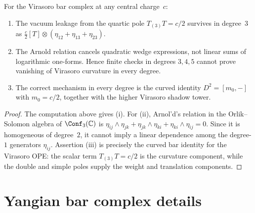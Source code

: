 \begin{proposition}
\label{prop:arnold-virasoro-deg3}
For the Virasoro bar complex at any central charge~$c$:
\begin{enumerate}[label=\textup{(\roman*)}]
\item The vacuum leakage from the quartic pole $T_{(3)}T=c/2$
survives in degree~$3$ as
$\frac c2[T]\otimes(\eta_{12}+\eta_{13}+\eta_{23})$.
\item The Arnold relation cancels quadratic wedge expressions, not
linear sums of logarithmic one-forms. Hence finite checks in degrees
$3,4,5$ cannot prove vanishing of Virasoro curvature in every degree.
\item The correct mechanism in every degree is the curved identity
$D^2=[m_0,-]$ with $m_0=c/2$, together with the higher Virasoro
shadow tower.
\end{enumerate}
\end{proposition}

\begin{proof}
The computation above gives (i). For (ii), Arnol'd's relation in the
Orlik--Solomon algebra of $\Conf_3(\mathbb C)$ is
$\eta_{ij}\wedge\eta_{jk}+\eta_{jk}\wedge\eta_{ki}
+\eta_{ki}\wedge\eta_{ij}=0$. Since it is homogeneous of degree~$2$,
it cannot imply a linear dependence among the degree-$1$ generators
$\eta_{ij}$. Assertion (iii) is precisely the curved bar identity for
the Virasoro OPE: the scalar term $T_{(3)}T=c/2$ is the curvature
component, while the double and simple poles supply the weight and
translation components.
\end{proof}


\section{Yangian bar complex details}
\label{sec:yangian-details}

